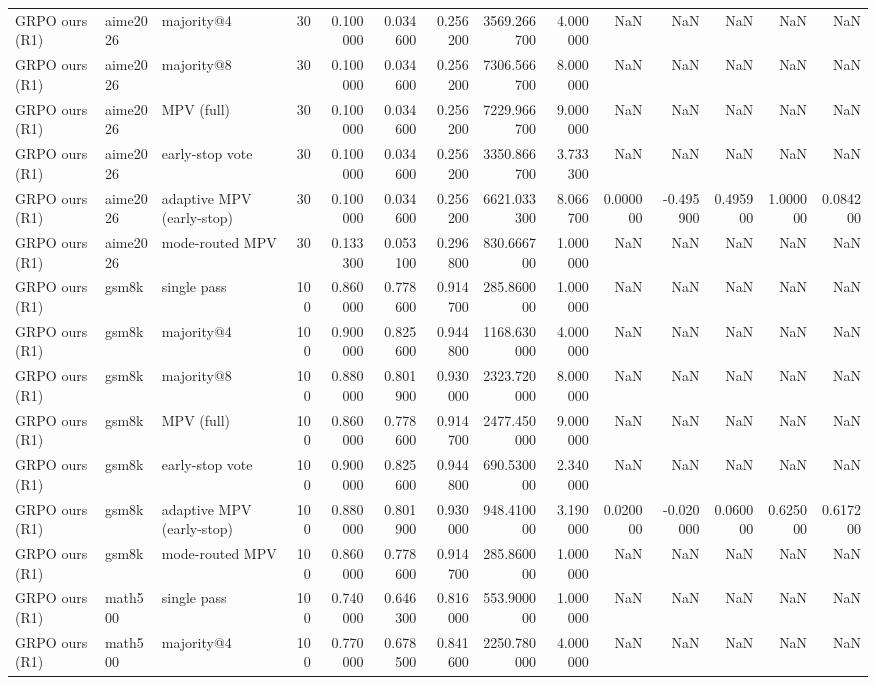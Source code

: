 \begin{table}
\begin{tabular}{lllrrrrrrrrrrr}
GRPO ours (R1) & aime2026 & majority@4 & 30 & 0.100000 & 0.034600 & 0.256200 & 3569.266700 & 4.000000 & NaN & NaN & NaN & NaN & NaN \\
GRPO ours (R1) & aime2026 & majority@8 & 30 & 0.100000 & 0.034600 & 0.256200 & 7306.566700 & 8.000000 & NaN & NaN & NaN & NaN & NaN \\
GRPO ours (R1) & aime2026 & MPV (full) & 30 & 0.100000 & 0.034600 & 0.256200 & 7229.966700 & 9.000000 & NaN & NaN & NaN & NaN & NaN \\
GRPO ours (R1) & aime2026 & early-stop vote & 30 & 0.100000 & 0.034600 & 0.256200 & 3350.866700 & 3.733300 & NaN & NaN & NaN & NaN & NaN \\
GRPO ours (R1) & aime2026 & adaptive MPV (early-stop) & 30 & 0.100000 & 0.034600 & 0.256200 & 6621.033300 & 8.066700 & 0.000000 & -0.495900 & 0.495900 & 1.000000 & 0.084200 \\
GRPO ours (R1) & aime2026 & mode-routed MPV & 30 & 0.133300 & 0.053100 & 0.296800 & 830.666700 & 1.000000 & NaN & NaN & NaN & NaN & NaN \\
GRPO ours (R1) & gsm8k & single pass & 100 & 0.860000 & 0.778600 & 0.914700 & 285.860000 & 1.000000 & NaN & NaN & NaN & NaN & NaN \\
GRPO ours (R1) & gsm8k & majority@4 & 100 & 0.900000 & 0.825600 & 0.944800 & 1168.630000 & 4.000000 & NaN & NaN & NaN & NaN & NaN \\
GRPO ours (R1) & gsm8k & majority@8 & 100 & 0.880000 & 0.801900 & 0.930000 & 2323.720000 & 8.000000 & NaN & NaN & NaN & NaN & NaN \\
GRPO ours (R1) & gsm8k & MPV (full) & 100 & 0.860000 & 0.778600 & 0.914700 & 2477.450000 & 9.000000 & NaN & NaN & NaN & NaN & NaN \\
GRPO ours (R1) & gsm8k & early-stop vote & 100 & 0.900000 & 0.825600 & 0.944800 & 690.530000 & 2.340000 & NaN & NaN & NaN & NaN & NaN \\
GRPO ours (R1) & gsm8k & adaptive MPV (early-stop) & 100 & 0.880000 & 0.801900 & 0.930000 & 948.410000 & 3.190000 & 0.020000 & -0.020000 & 0.060000 & 0.625000 & 0.617200 \\
GRPO ours (R1) & gsm8k & mode-routed MPV & 100 & 0.860000 & 0.778600 & 0.914700 & 285.860000 & 1.000000 & NaN & NaN & NaN & NaN & NaN \\
GRPO ours (R1) & math500 & single pass & 100 & 0.740000 & 0.646300 & 0.816000 & 553.900000 & 1.000000 & NaN & NaN & NaN & NaN & NaN \\
GRPO ours (R1) & math500 & majority@4 & 100 & 0.770000 & 0.678500 & 0.841600 & 2250.780000 & 4.000000 & NaN & NaN & NaN & NaN & NaN \\

\end{tabular}
\end{table}
